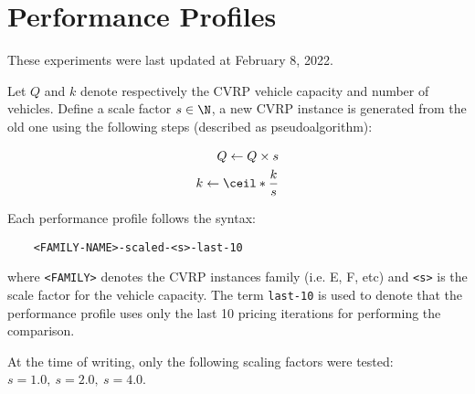 \chapter{Performance Profiles}
These experiments were last updated at February 8, 2022.

Let $Q$ and $k$ denote respectively the CVRP vehicle capacity and number of vehicles.
Define a scale factor $s \in \N$, a new CVRP instance is generated from the old one using the following steps (described as pseudoalgorithm):

\begin{align}
	Q \gets Q \times s \\
	k \gets \ceil*{\frac{k}{s}}
\end{align}

Each performance profile follows the syntax:

\begin{verbatim}
	<FAMILY-NAME>-scaled-<s>-last-10
\end{verbatim}

where \texttt{<FAMILY>} denotes the CVRP instances family (i.e. E, F, etc) and \texttt{<s>} is the scale factor for the vehicle capacity.
The term \texttt{last-10} is used to denote that the performance profile uses only the last 10 pricing iterations for performing the comparison.

At the time of writing, only the following scaling factors were tested: $s = 1.0,\ s = 2.0,\ s = 4.0$.

\newcommand{\IncludePerfProf}[1]{
	\begin{figure}[ht]
		\centering
		\begin{subfigure}{0.5\textwidth}
			\centering
			\texttt{[image: \#1/TimeRatioPlot.pdf]}
		\end{subfigure}%
		\begin{subfigure}{0.5\textwidth}
			\centering
			\texttt{[image: \#1/RelativeCostPlot.pdf]}
		\end{subfigure}%
	\end{figure}
}

